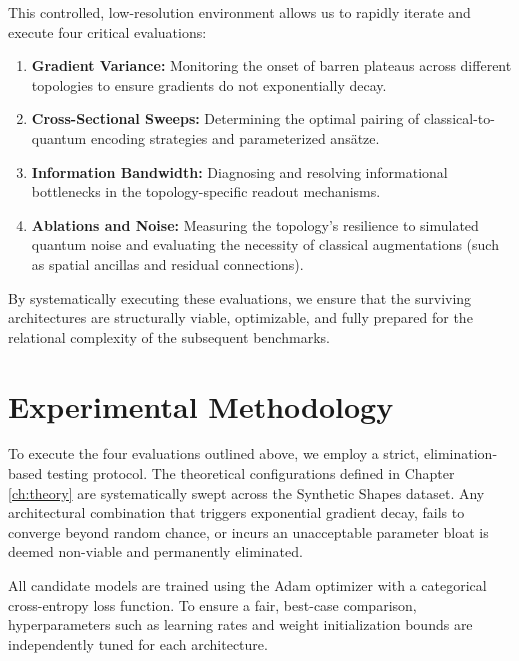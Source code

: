 \documentclass[12pt, a4paper, oneside]{report}
\begin{document}
This controlled, low-resolution environment allows us to rapidly iterate and execute four critical evaluations:
\begin{enumerate}
    \item \textbf{Gradient Variance:} Monitoring the onset of barren plateaus across different topologies to ensure gradients do not exponentially decay.
    \item \textbf{Cross-Sectional Sweeps:} Determining the optimal pairing of classical-to-quantum encoding strategies and parameterized ans\"{a}tze.
    \item \textbf{Information Bandwidth:} Diagnosing and resolving informational bottlenecks in the topology-specific readout mechanisms.
    \item \textbf{Ablations and Noise:} Measuring the topology's resilience to simulated quantum noise and evaluating the necessity of classical augmentations (such as spatial ancillas and residual connections).
\end{enumerate}

By systematically executing these evaluations, we ensure that the surviving architectures are structurally viable, optimizable, and fully prepared for the relational complexity of the subsequent benchmarks.

\section{Experimental Methodology}

To execute the four evaluations outlined above, we employ a strict, elimination-based testing protocol. The theoretical configurations defined in Chapter \ref{ch:theory} are systematically swept across the Synthetic Shapes dataset. Any architectural combination that triggers exponential gradient decay, fails to converge beyond random chance, or incurs an unacceptable parameter bloat is deemed non-viable and permanently eliminated. 

All candidate models are trained using the Adam optimizer with a categorical cross-entropy loss function. To ensure a fair, best-case comparison, hyperparameters such as learning rates and weight initialization bounds are independently tuned for each architecture. 
\end{document}

